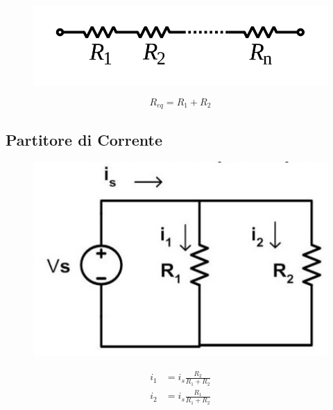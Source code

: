 \documentclass[fontsize=8pt]{scrartcl}
\begin{document}
\begin{multicols*}{2}
\begin{minipage}[m]{.45\linewidth}
    \begin{figure}[H]
        \centering
        \includegraphics[width=.8\linewidth]{images/serie.png}
    \end{figure}
\end{minipage}
\begin{minipage}[m]{.45\linewidth}
    \begin{equation*}
        R_{eq}=R_1+R_2
    \end{equation*}
\end{minipage}

\subsection*{Partitore di Corrente}

\begin{minipage}[m]{.45\linewidth}
    \begin{figure}[H]
        \centering
        \includegraphics[width=.8\linewidth]{images/partitore_corrente.jpg}
    \end{figure}
\end{minipage}
\begin{minipage}[m]{.45\linewidth}
    \begin{align*}
        i_1 &= i_s\frac{R_2}{R_1+R_2}\\
        i_2 &= i_s\frac{R_1}{R_1+R_2}
    \end{align*}
\end{minipage}


\end{multicols*}
\end{document}

